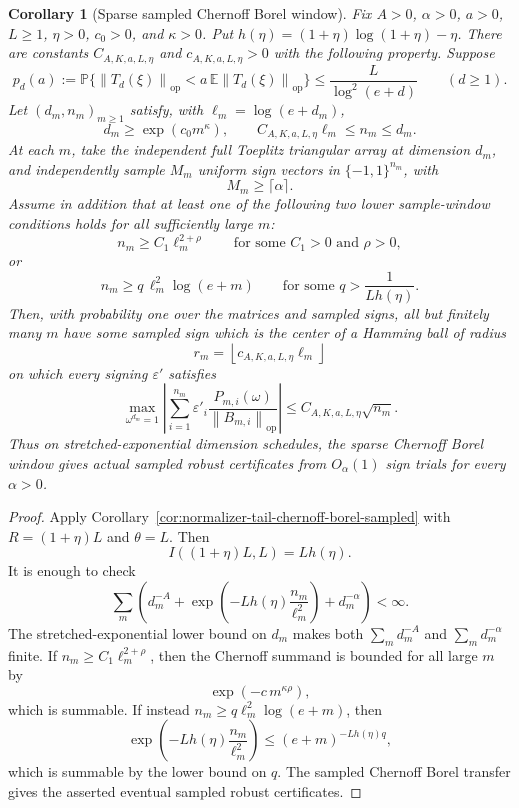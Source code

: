 \documentclass[11pt]{amsart}
\numberwithin{equation}{section}
\newtheorem{corollary}[theorem]{Corollary}
\theoremstyle{definition}
\theoremstyle{remark}
\newcommand{\op}{\mathrm{op}}
\newcommand{\Prob}{\mathbb P}
\newcommand{\Exp}{\mathbb E}
\newcommand{\norm}[1]{\left\lVert #1\right\rVert}
\newcommand{\eps}{\varepsilon}
\begin{document}
\begin{corollary}[Sparse sampled Chernoff Borel window]
\label{cor:normalizer-tail-chernoff-borel-window-sampled}
Fix \(A>0\), \(\alpha>0\), \(a>0\), \(L\ge1\), \(\eta>0\), \(c_0>0\), and
\(\kappa>0\).  Put \(h(\eta)=(1+\eta)\log(1+\eta)-\eta\).  There are constants
\(C_{A,K,a,L,\eta}\) and \(c_{A,K,a,L,\eta}>0\) with the following property.
Suppose
\[
  p_d(a):=\Prob\{\norm{T_d(\xi)}_{\op}
      <a\,\Exp\norm{T_d(\xi)}_{\op}\}
  \le \frac{L}{\log^2(e+d)}
  \qquad(d\ge1).
\]
Let \((d_m,n_m)_{m\ge1}\) satisfy, with \(\ell_m=\log(e+d_m)\),
\[
  d_m\ge \exp(c_0m^\kappa),\qquad
  C_{A,K,a,L,\eta}\ell_m\le n_m\le d_m .
\]
At each \(m\), take the independent full Toeplitz triangular array at dimension
\(d_m\), and independently sample \(M_m\) uniform sign vectors in
\(\{-1,1\}^{n_m}\), with
\[
  M_m\ge\lceil\alpha\rceil .
\]
Assume in addition that at least one of the following two lower sample-window
conditions holds for all sufficiently large \(m\):
\[
  n_m\ge C_1\ell_m^{2+\rho}
  \qquad\text{for some } C_1>0 \text{ and } \rho>0,
\]
or
\[
  n_m\ge q\,\ell_m^2\log(e+m)
  \qquad\text{for some } q>\frac1{Lh(\eta)} .
\]
Then, with probability one over the matrices and sampled signs, all but
finitely many \(m\) have some sampled sign which is the center of a Hamming ball
of radius
\[
  r_m=\left\lfloor c_{A,K,a,L,\eta}\ell_m\right\rfloor
\]
on which every signing \(\eps'\) satisfies
\[
  \max_{\omega^{d_m}=1}
  \left|\sum_{i=1}^{n_m}\eps'_i
  \frac{P_{m,i}(\omega)}{\norm{B_{m,i}}_{\op}}\right|
  \le C_{A,K,a,L,\eta}\sqrt{n_m}.
\]
Thus on stretched-exponential dimension schedules, the sparse Chernoff Borel
window gives actual sampled robust certificates from \(O_\alpha(1)\) sign trials
for every \(\alpha>0\).
\end{corollary}

\begin{proof}
Apply Corollary~\ref{cor:normalizer-tail-chernoff-borel-sampled} with
\(R=(1+\eta)L\) and \(\theta=L\).  Then
\[
  I((1+\eta)L,L)=Lh(\eta).
\]
It is enough to check
\[
  \sum_m\left(d_m^{-A}
  +\exp\left(-Lh(\eta)\frac{n_m}{\ell_m^2}\right)
  +d_m^{-\alpha}\right)<\infty .
\]
The stretched-exponential lower bound on \(d_m\) makes both
\(\sum_m d_m^{-A}\) and \(\sum_m d_m^{-\alpha}\) finite.  If
\(n_m\ge C_1\ell_m^{2+\rho}\), then the Chernoff summand is bounded for all
large \(m\) by
\[
  \exp(-c\,m^{\kappa\rho}),
\]
which is summable.  If instead
\(n_m\ge q\ell_m^2\log(e+m)\), then
\[
  \exp\left(-Lh(\eta)\frac{n_m}{\ell_m^2}\right)
  \le (e+m)^{-Lh(\eta)q},
\]
which is summable by the lower bound on \(q\).  The sampled Chernoff Borel
transfer gives the asserted eventual sampled robust certificates.
\end{proof}
\end{document}
